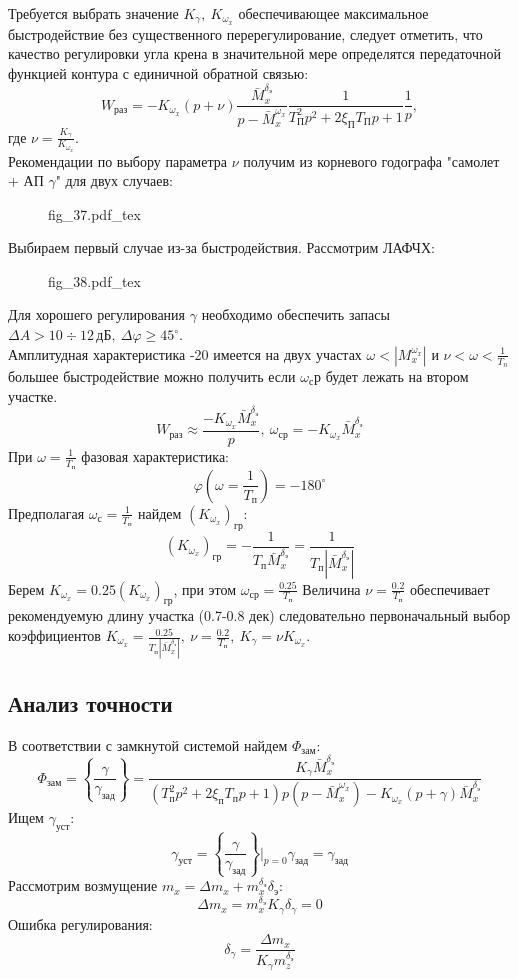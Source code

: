 \documentclass{article}
\begin{document}
Требуется выбрать значение $K_\gamma, \ K_{\omega_x}$ обеспечивающее максимальное быстродействие без существенного перерегулирование, следует отметить, что качество регулировки угла крена в значительной мере определятся передаточной функцией контура с единичной обратной связью: 
\[
W_{раз} = -K_{\omega_x} (p + \nu)\frac{\bar{M}_x^{\delta_э}}{p -\bar{M}_x^{\omega_x}}\frac{1}{T_П^2 p^2 + 2 \xi_П T_П p + 1}\frac{1}{p},
\]
где $\nu = \frac{K_\gamma}{K_{\omega_x}}$.\\
Рекомендации по выбору параметра $\nu$ получим из корневого годографа "самолет + АП $\gamma$" для двух случаев:

\begin{figure}[H]
    \centering
{fig_37.pdf_tex}
\end{figure}
Выбираем первый случае из-за быстродействия. 
Рассмотрим ЛАФЧХ:
\begin{figure}[H]
    \centering
{fig_38.pdf_tex}
\end{figure}

Для хорошего регулирования $\gamma$ необходимо обеспечить запасы $\Delta A > 10 \div 12 \, дБ,\ \Delta \varphi \geq 45^\circ$.\\
Амплитудная характеристика -20 имеется на двух участах $\omega < |M_x^{\omega_x}|$ и $\nu < \omega <\frac{1}{T_n}$ большее быстродействие можно получить если $\omega_ср$ будет лежать на втором участке.
\[
W_{раз} \approx \frac{-K_{\omega_x} \bar{M}_x^{\delta_э}}{p},\ \omega_{ср} = -K_{\omega_x} \bar{M}_x^{\delta_э}
\]
При $\omega = \frac{1}{T_п}$ фазовая характеристика:
\[
\varphi(\omega=\frac{1}{T_п}) = -180^\circ
\]
Предполагая $\omega_с = \frac{1}{T_п}$ найдем $(K_{\omega_x})_{гр}$:
\[
(K_{\omega_x})_{гр} = -\frac{1}{T_п \bar{M}_x^{\delta_э}} = \frac{1}{T_п |\bar{M}_x^{\delta_э}|}
\]
Берем $K_{\omega_x} = 0.25(K_{\omega_x})_{гр}$, при этом $\omega_{ср} = \frac{0.25}{T_п}$	
Величина $\nu =\frac{0.2}{T_п}$ обеспечивает рекомендуемую длину участка (0.7-0.8 дек) следовательно первоначальный выбор коэффициентов $K_{\omega_x} =\frac{0.25}{T_п |\bar{M}_x^{\delta_э}|}, \ \nu= \frac{0.2}{T_п},\ K_\gamma = \nu K_{\omega_x}$.

\subsection{Анализ точности}
В соответствии с замкнутой системой найдем $\Phi_{зам}$:
\[
\Phi_{зам} =\left\{\frac{\gamma}{\gamma_{зад}}\right\} = \frac{K_\gamma \bar{M}_x^{\delta_э}}{(T_п^2 p^2 + 2 \xi_п T_п p + 1)p(p - \bar{M}_x^{\omega_x}) - K_{\omega_x}(p + \gamma)\bar{M}_x^{\delta_э}} 
\]
Ищем $\gamma_{уст}$:
\[ \gamma_{уст} = \left\{\frac{\gamma}{\gamma_{зад}}\right\}\Big|_{p = 0} \gamma_{зад} = \gamma_{зад} \]
Рассмотрим возмущение $m_x = \Delta m_x + m_x^{\delta_э} \delta_э$:
\[
\Delta m_x = m_x^{\delta_э} K_\gamma \delta_\gamma = 0
\]
Ошибка регулирования:
\[
\delta_\gamma =\frac{\Delta m_x}{K_\gamma m_z^{\delta_э}} 
\]
\end{document}
